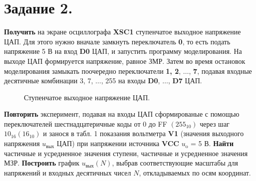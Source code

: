 \documentclass[spec, och, otchet, hidelinks]{SCWorks}
\begin{document}
\newpage

\section*{Задание 2.}

\textbf{Получить} на экране осциллографа \textbf{XSC1} ступенчатое выходное напряжение ЦАП. Для этого нужно вначале замкнуть переключатель \textbf{0}, 
то есть подать напряжение 5 В на вход \textbf{D0} ЦАП, и запустить программу моделирования. На выходе ЦАП формируется напряжение, равное ЗМР. Затем во 
время остановок моделирования замыкать поочередно переключатели \textbf{1, 2}, $ \dots $, \textbf{7}, подавая входные десятичные комбинации 3, 7, 
$ \dots $, 255 на входы \textbf{D0}, $\dots$, \textbf{D7} ЦАП.

\begin{figure}[h]
	\caption{Ступенчатое выходное напряжение ЦАП.}
\end{figure}

\newpage

\textbf{Повторить} эксперимент, подавая на входы ЦАП сформированые с помощью переключателей шестнадцатеричные коды от 0 до FF $(255_{10})$ через шаг 
$10_{16} (16_{10})$ и занося в табл. 1 показания вольтметра \textbf{V1} (значения выходного напряжения $ u_\text{вых} $ ЦАП) при напряжении источника 
\textbf{VCC} $ u_\text{o} $ = 5 В. \textbf{Найти} частичные и усредненное значения ступени, частичные и усредненное значения МЗР. \textbf{Построить} 
график $ u_\text{вых}(N) $, выбрав соответствующие масштабы для напряжений и входных десятичных чисел $N$, откладываемых по осям координат.
\end{document}
